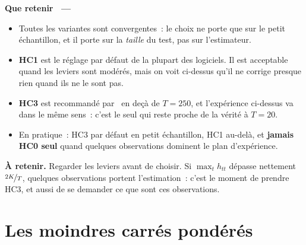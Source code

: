 \documentclass[10pt,a4paper]{article}
\makeatletter
\theoremstyle{definition}
\renewcommand{\newline}{\unskip\par\vspace{1.5pt}}
\newenvironment{frame}[1][]{\par}{\par}
\newcommand{\frameheadrule}{%
  \par\nobreak\vspace{1pt}{\color{ctitle}\hrule height 0.6pt}\nobreak\vspace{4pt}}
\newcommand{\frametitle}[1]{%
  \par\addvspace{8pt plus 2pt}\needspace{6\baselineskip}%
  \noindent\begingroup\color{ctitle}\sffamily\bfseries\large #1\endgroup
  \@ifnextchar\framesubtitle{}{\frameheadrule}}
\newcommand{\framesubtitle}[1]{%
  \begingroup\color{ctitle}\sffamily\normalsize\ --- #1\endgroup\frameheadrule}
\newcommand{\dnote}[1]{\begin{notebox}\footnotesize\textbf{À retenir. }#1\end{notebox}}
\makeatother
\begin{document}
\begin{frame}
  \frametitle{Que retenir}

  \begin{itemize}

  \item Toutes les variantes sont convergentes~: le choix ne porte que sur le
    petit échantillon, et il porte sur la \emph{taille} du test, pas sur
    l'estimateur.\newline

  \item \textbf{HC1} est le réglage par défaut de la plupart des logiciels. Il
    est acceptable quand les leviers sont modérés, mais on voit ci-dessus qu'il
    ne corrige presque rien quand ils ne le sont pas.\newline

  \item \textbf{HC3} est recommandé par~\cite{LongErvin2000} en deçà de $T=250$,
    et l'expérience ci-dessus va dans le même sens~: c'est le seul qui reste
    proche de la vérité à $T=20$.\newline

  \item[$\Rightarrow$] En pratique~: HC3 par défaut en petit échantillon, HC1
    au-delà, et \textbf{jamais HC0 seul} quand quelques observations dominent le
    plan d'expérience.\newline

  \end{itemize}

  \dnote{Regarder les leviers avant de choisir. Si
    $\max_t h_{tt}$ dépasse nettement $\nicefrac{2K}{T}$, quelques observations
    portent l'estimation~: c'est le moment de prendre HC3, et aussi de se
    demander ce que sont ces observations.}

\end{frame}


\section{Les moindres carrés pondérés}
\end{document}
